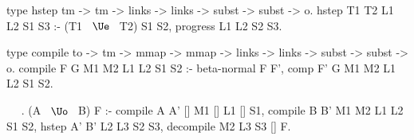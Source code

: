 \begin{elpicode}

type hstep tm -> tm -> links -> links -> subst -> subst -> o.
hstep T1 T2 L1 L2 S1 S3 :-
  (T1 ~$\Ue$~ T2) S1 S2,
  progress L1 L2 S2 S3.

type compile to -> tm -> mmap -> mmap ->  links -> links -> 
  subst -> subst -> o.
compile F G M1 M2 L1 L2 S1 S2 :-
  beta-normal F F', comp F' G M1 M2 L1 L2 S1 S2.

~  ~.
(A ~$\Uo$~ B) F :-
  compile A A' [] M1 [] L1 [] S1,
  compile B B' M1 M2 L1 L2 S1 S2,
  hstep A' B' L2 L3 S2 S3,
  decompile M2 L3 S3 [] F.

\end{elpicode}
